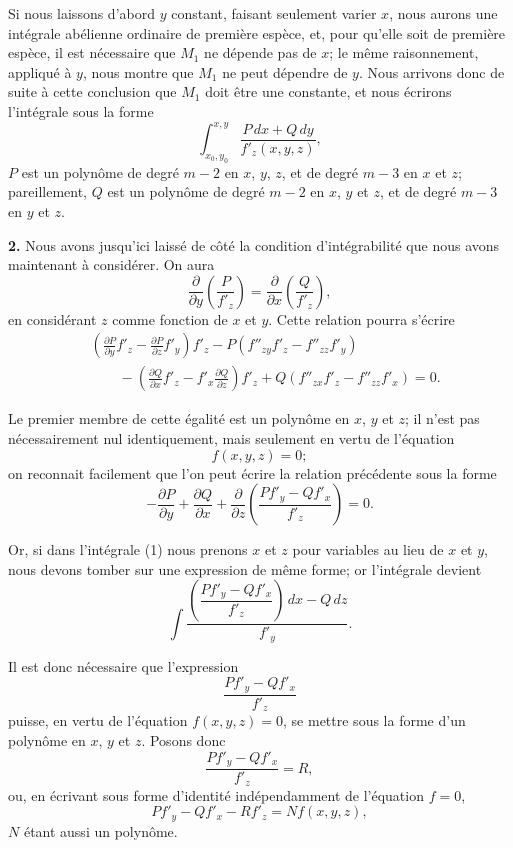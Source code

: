 \documentclass{article}
\begin{document}
Si nous laissons d'abord $y$ constant, faisant seulement varier $x$, nous aurons une intégrale abélienne ordinaire de première espèce, et, pour qu'elle soit de première espèce, il est nécessaire que $M_{1}$ ne dépende pas de $x$; le même raisonnement, appliqué à $y$, nous montre que $M_{1}$ ne peut dépendre de $y$. Nous arrivons donc de suite à cette conclusion que $M_{1}$ doit être une constante, et nous écrirons l'intégrale sous la forme
\[
\int_{x_{0}, y_{0}}^{x, y} \frac{P\,dx + Q\,dy}{f'_{z}(x, y, z)}, \tag{1}
\]
$P$ est un polynôme de degré $m - 2$ en $x$, $y$, $z$, et de degré $m - 3$ en $x$ et $z$; pareillement, $Q$ est un polynôme de degré $m - 2$ en $x$, $y$ et $z$, et de degré $m - 3$ en $y$ et $z$.

\textbf{2.} Nous avons jusqu'ici laissé de côté la condition d'intégrabilité que nous avons maintenant à considérer. On aura
\[
\frac{\partial}{\partial y}\left(\frac{P}{f'_{z}}\right) = \frac{\partial}{\partial x}\left(\frac{Q}{f'_{z}}\right),
\]
en considérant $z$ comme fonction de $x$ et $y$. Cette relation pourra
s'écrire
\[
\begin{aligned}
&\left(\frac{\partial P}{\partial y}f'_{z} - \frac{\partial P}{\partial z}f'_{y}\right)f'_{z} - P(f''_{zy}f'_{z} - f''_{zz}f'_{y}) \\
&\qquad - \left(\frac{\partial Q}{\partial x}f'_{z} - f'_{x}\frac{\partial Q}{\partial z}\right)f'_{z} + Q(f''_{zx}f'_{z} - f''_{zz}f'_{x}) = 0.
\end{aligned}
\]

Le premier membre de cette égalité est un polynôme en $x$, $y$ et $z$; il n'est pas nécessairement nul identiquement, mais seulement en vertu de l'équation
\[
f(x, y, z) = 0;
\]
on reconnait facilement que l'on peut écrire la relation précédente sous la forme
\[
-\frac{\partial P}{\partial y} + \frac{\partial Q}{\partial x} + \frac{\partial}{\partial z}\left(\frac{Pf'_{y} - Qf'_{x}}{f'_{z}}\right) = 0. \tag{1}
\]

Or, si dans l'intégrale (1) nous prenons $x$ et $z$ pour variables au lieu de $x$ et $y$, nous devons tomber sur une expression de même forme; or l'intégrale devient
\[
\int \frac{\left(\dfrac{Pf'_{y} - Qf'_{x}}{f'_{z}}\right)\,dx - Q\,dz}{f'_{y}}.
\]

Il est donc nécessaire que l'expression
\[
\frac{Pf'_{y} - Qf'_{x}}{f'_{z}}
\]
puisse, en vertu de l'équation $f(x, y, z) = 0$, se mettre sous la forme d'un polynôme en $x$, $y$ et $z$. Posons donc
\[
\frac{Pf'_{y} - Qf'_{x}}{f'_{z}} = R,
\]
ou, en écrivant sous forme d'identité indépendamment de l'équation $f = 0$,
\[
Pf'_{y} - Qf'_{x} - Rf'_{z} = Nf(x, y, z), \tag{2}
\]
$N$ étant aussi un polynôme.
\end{document}
